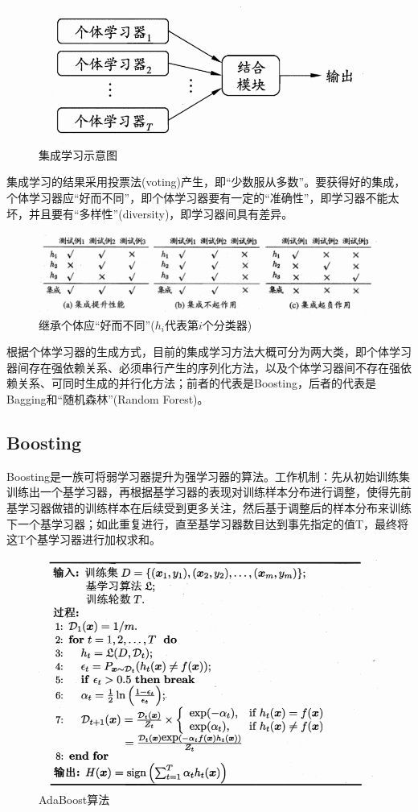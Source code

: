 \documentclass[cn,hazy,black,normal]{elegantnote}
\numberwithin{equation}{section}
\numberwithin{figure}{section}
\begin{document}
			\begin{figure}[H]
				\centering
				\includegraphics[width=.6\linewidth]{images/ensemble-learning.png}
				\caption{{\rm 集成学习示意图}}
				\label{ensemble-learning}
			\end{figure}
			
			集成学习的结果采用投票法(voting)产生，即“少数服从多数”。要获得好的集成，个体学习器应“好而不同”，即个体学习器要有一定的“准确性”，即学习器不能太坏，并且要有“多样性”(diversity)，即学习器间具有差异。
			
			\begin{figure}[H]
				\centering
				\includegraphics[width=.8\linewidth]{images/ensemble-learning2.png}
				\caption{{\rm 继承个体应“好而不同”($h_i$代表第$i$个分类器)}}
				\label{ensemble-learning2}
			\end{figure}
			
			根据个体学习器的生成方式，目前的集成学习方法大概可分为两大类，即个体学习器间存在强依赖关系、必须串行产生的序列化方法，以及个体学习器间不存在强依赖关系、可同时生成的并行化方法；前者的代表是Boosting，后者的代表是Bagging和“随机森林”(Random Forest)。

		\subsection{Boosting}
			Boosting是一族可将弱学习器提升为强学习器的算法。工作机制：先从初始训练集训练出一个基学习器，再根据基学习器的表现对训练样本分布进行调整，使得先前基学习器做错的训练样本在后续受到更多关注，然后基于调整后的样本分布来训练下一个基学习器；如此重复进行，直至基学习器数目达到事先指定的值T，最终将这T个基学习器进行加权求和。
			
			\begin{figure}[H]
				\centering
				\includegraphics[width=.7\linewidth]{images/Adaboost.png}
				\caption{{\rm AdaBoost算法}}
				\label{AdaBoost}
			\end{figure}
			
\end{document}
